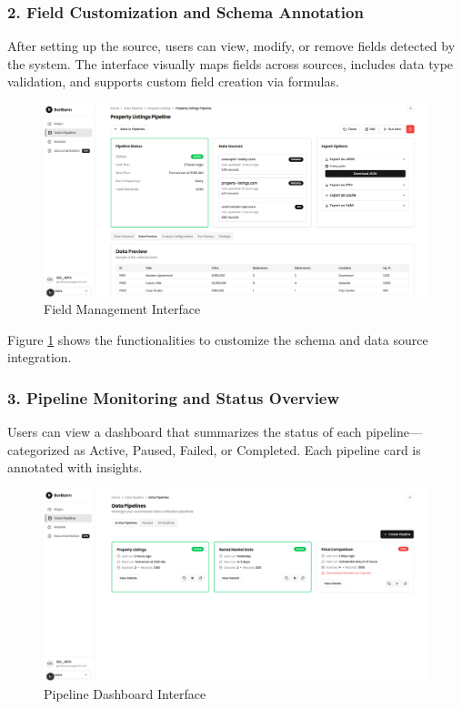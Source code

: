 \subsubsection*{2. Field Customization and Schema Annotation}

After setting up the source, users can view, modify, or remove fields detected by the system. The interface visually maps fields across sources, includes data type validation, and supports custom field creation via formulas.

\begin{figure}[htbp]
	\centering
	\includegraphics[width=1\textwidth]{assets/ai/pipeline-4.png}
	\caption{Field Management Interface}
	\label{fig:pipeline-creation-ui-3}
\end{figure}

Figure \ref{fig:pipeline-creation-ui-3} shows the functionalities to customize the schema and data source integration.

\subsubsection*{3. Pipeline Monitoring and Status Overview}

Users can view a dashboard that summarizes the status of each pipeline—categorized as Active, Paused, Failed, or Completed. Each pipeline card is annotated with insights.

\begin{figure}[htbp]
	\centering
	\includegraphics[width=1\textwidth]{assets/ai/pipeline-6.png}
	\caption{Pipeline Dashboard Interface}
	\label{fig:pipeline-creation-ui-4}
\end{figure}

